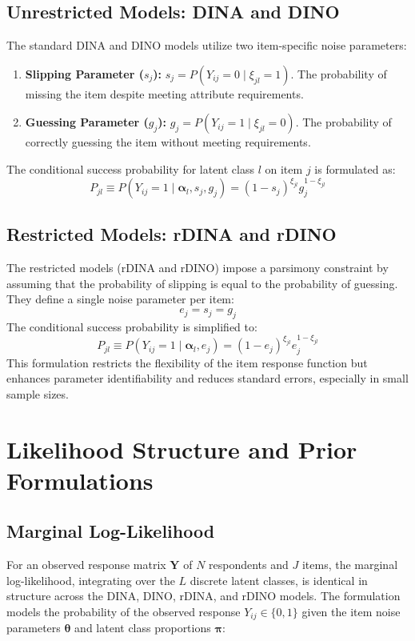 \documentclass[11pt,a4paper]{article}
\begin{document}
\subsection{Unrestricted Models: DINA and DINO}
The standard DINA and DINO models utilize two item-specific noise parameters:
\begin{enumerate}
    \item \textbf{Slipping Parameter ($s_j$):} $s_j = P(Y_{ij} = 0 \mid \xi_{jl} = 1)$. 
    The probability of missing the item despite meeting attribute requirements.
    \item \textbf{Guessing Parameter ($g_j$):} $g_j = P(Y_{ij} = 1 \mid \xi_{jl} = 0)$. 
    The probability of correctly guessing the item without meeting requirements.
\end{enumerate}
The conditional success probability for latent class $l$ on item $j$ is formulated as:
\begin{equation}
    P_{jl} \equiv P(Y_{ij} = 1 \mid \boldsymbol{\alpha}_l, s_j, g_j) 
    = (1 - s_j)^{\xi_{jl}} g_j^{1 - \xi_{jl}}
\end{equation}

\subsection{Restricted Models: rDINA and rDINO}
The restricted models (rDINA and rDINO) impose a parsimony constraint 
by assuming that the probability of slipping is equal to 
the probability of guessing. They define a single noise parameter per item:
\begin{equation}
    e_j = s_j = g_j
\end{equation}
The conditional success probability is simplified to:
\begin{equation}
    P_{jl} \equiv P(Y_{ij} = 1 \mid \boldsymbol{\alpha}_l, e_j) 
    = (1 - e_j)^{\xi_{jl}} e_j^{1 - \xi_{jl}}
\end{equation}
This formulation restricts the flexibility of the item response function 
but enhances parameter identifiability and reduces standard errors, 
especially in small sample sizes.

\section{Likelihood Structure and Prior Formulations}

\subsection{Marginal Log-Likelihood}
For an observed response matrix $\mathbf{Y}$ of $N$ respondents and $J$ items, 
the marginal log-likelihood, integrating over the $L$ discrete latent classes, 
is identical in structure across the DINA, DINO, rDINA, and rDINO models. 
The formulation models the probability of the observed response $Y_{ij} \in \{0, 1\}$ 
given the item noise parameters $\boldsymbol{\theta}$ 
and latent class proportions $\boldsymbol{\pi}$:
\end{document}
